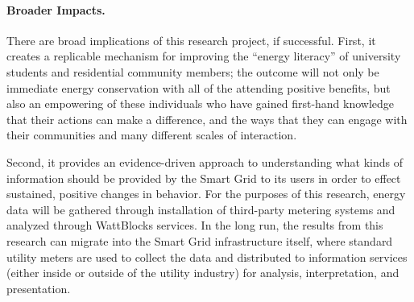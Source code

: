 \paragraph{Broader Impacts.}

There are broad implications of this research project, if successful.
First, it creates a replicable mechanism for improving the ``energy
literacy'' of university students and residential community members; the
outcome will not only be immediate energy conservation with all of the
attending positive benefits, but also an empowering of these individuals
who have gained first-hand knowledge that their actions can make a
difference, and the ways that they can engage with their communities and
many different scales of interaction.

Second, it provides an evidence-driven approach to understanding what kinds
of information should be provided by the Smart Grid to its users in order
to effect sustained, positive changes in behavior.  For the purposes of
this research, energy data will be gathered through installation of
third-party metering systems and analyzed through WattBlocks services. In
the long run, the results from this research can migrate into the Smart
Grid infrastructure itself, where standard utility meters are used to
collect the data and distributed to information services (either inside or
outside of the utility industry) for analysis, interpretation, and
presentation.














